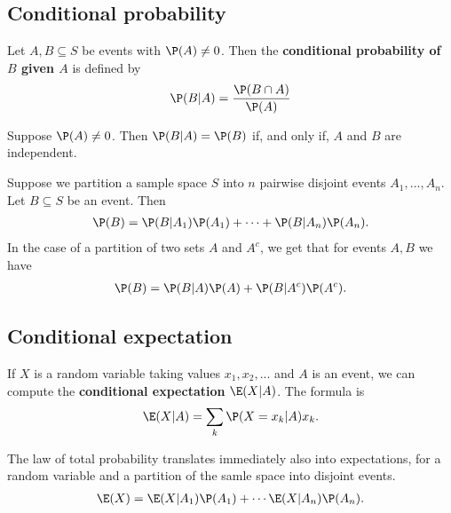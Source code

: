 \documentclass{article}
\begin{document}
\subsection{Conditional probability}
\begin{definition}
    Let $A,B\subseteq S$ be events with $\P(A)\not=0$. Then the 
    \textbf{conditional probability of $B$ given $A$} is defined by
    \begin{align*}
        \P(B|A) = \frac{\P(B\cap A)}{\P(A)}
    \end{align*}
\end{definition}
\begin{theorem}
    Suppose $\P(A)\not= 0$. Then $\P(B|A)=\P(B)$ if, and only if, $A$ and $B$ are independent.
\end{theorem}
\begin{theorem}
    Suppose we partition a sample space $S$ into $n$ pairwise disjoint events $A_1, ..., A_n$.
    Let $B\subseteq S$ be an event. Then
    \begin{align*}
        \P(B)=\P(B|A_1)\P(A_1)+ \cdots + \P(B|A_n)\P(A_n).
    \end{align*} 
    In the case of a partition of two sets $A$ and $A^c$, we get that for events $A,B$ we have
    \begin{align*}
        \P(B) = \P(B|A)\P(A)+\P(B|A^c)\P(A^c).
    \end{align*}
\end{theorem}
\subsection{Conditional expectation}
\begin{definition}
    If $X$ is a random variable taking values $x_1, x_2, ...$ and $A$ is an event, we can
    compute the \textbf{conditional expectation} $\E(X|A)$. The formula is
    \begin{align*}
        \E(X|A) = \sum_k \P(X=x_k|A)x_k.
    \end{align*}
\end{definition}
\begin{proposition}
    The law of total probability translates immediately also into expectations, for a random
    variable and a partition of the samle space into disjoint events.
    \begin{align*}
        \E(X) = \E(X|A_1)\P(A_1)+\cdots\E(X|A_n)\P(A_n).
    \end{align*} 
\end{proposition}
\end{document}
